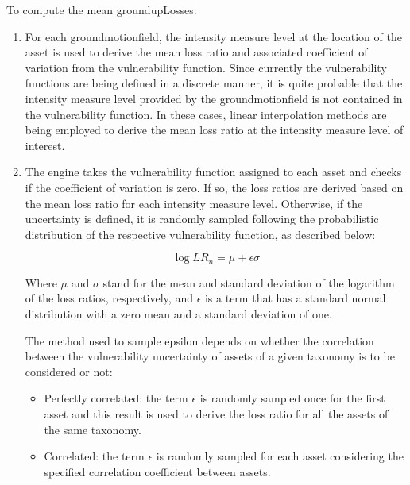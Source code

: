 To compute the mean \gls{groundupLosses}:

\begin{enumerate}
\item For each \gls{groundmotionfield}, the intensity measure level at the location of the \gls{asset} is used to derive the mean loss ratio and associated coefficient of variation from the \gls{vulnerability function}. Since currently the \glspl{vulnerability function} are being defined in a discrete manner, it is quite probable that the intensity measure level provided by the \gls{groundmotionfield} is not contained in the \gls{vulnerability function}. In these cases, linear interpolation methods are being employed to derive the mean loss ratio at the intensity measure level of interest. 

\item The engine takes the \gls{vulnerability function} assigned to each \gls{asset} and checks if the coefficient of variation is zero. If so, the loss ratios are derived based on the mean loss ratio for each intensity measure level. Otherwise, if the uncertainty is defined, it is randomly sampled following the probabilistic distribution of the respective \gls{vulnerability function}, as described below:

\begin{equation}
\log{LR_n} = \mu + \epsilon\sigma
\end{equation}

Where $\mu$ and $\sigma$ stand for the mean and standard deviation of the logarithm of the loss ratios, respectively, and $\epsilon$ is a term that has a standard normal distribution with a zero mean and a standard deviation of one.  

The method used to sample epsilon depends on whether the correlation between the vulnerability uncertainty of \glspl{asset} of a given \gls{taxonomy} is to be considered or not:

\begin{itemize}

\item Perfectly correlated: the term $\epsilon$ is randomly sampled once for the first \gls{asset} and this result is used to derive the loss ratio for all the \glspl{asset} of the same \gls{taxonomy}. 

\item Correlated: the term $\epsilon$ is randomly sampled for each \gls{asset} considering the specified correlation coefficient between \glspl{asset}. 


\end{itemize}
\end{enumerate}
